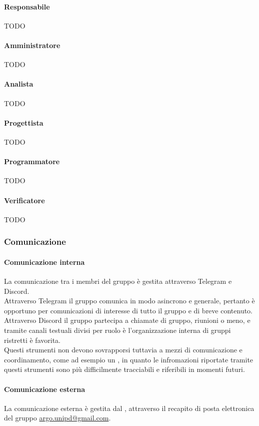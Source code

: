 \paragraph{Responsabile}
TODO
\paragraph{Amministratore}
TODO
\paragraph{Analista}
TODO
\paragraph{Progettista}
TODO
\paragraph{Programmatore}
TODO
\paragraph{Verificatore}
TODO

\subsubsection{Comunicazione}
\paragraph{Comunicazione interna}
La comunicazione tra i membri del gruppo è gestita attraverso Telegram e Discord.\\
Attraverso Telegram il gruppo comunica in modo asincrono e generale, pertanto è opportuno per comunicazioni di interesse di tutto il gruppo e di breve contenuto.\\
Attraverso Discord il gruppo partecipa a chiamate di gruppo, riunioni o meno, e tramite canali testuali divisi per ruolo è l'organizzazione interna di gruppi ristretti è favorita.\\
Questi strumenti non devono sovrapporsi tuttavia a mezzi di comunicazione e coordinamento, come ad esempio un , in quanto le infromazioni riportate tramite questi strumenti sono più difficilmente tracciabili e riferibili in momenti futuri.

\paragraph{Comunicazione esterna}
La comunicazione esterna è gestita dal \Responsabile, attraverso il recapito di posta elettronica del gruppo \href{mailto:argo.unipd@gmail.com}{argo.unipd\-@\-gmail.com}.